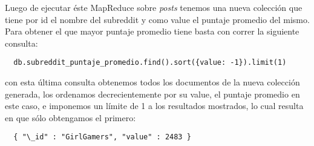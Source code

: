 Luego de ejecutar éste MapReduce sobre \textit{posts} tenemos una nueva
colección que tiene por id el nombre del subreddit y como value el puntaje
promedio del mismo. Para obtener el que mayor puntaje promedio tiene basta
con correr la siguiente consulta:
\begin{lstlisting}
  db.subreddit_puntaje_promedio.find().sort({value: -1}).limit(1)
\end{lstlisting}
con esta última consulta obtenemos todos los documentos de la nueva colección
generada, los ordenamos decrecientemente por su value, el puntaje promedio
en este caso, e imponemos un límite de 1 a los resultados mostrados, lo cual
resulta en que sólo obtengamos el primero:
\begin{lstlisting}
  { "\_id" : "GirlGamers", "value" : 2483 }
\end{lstlisting}

